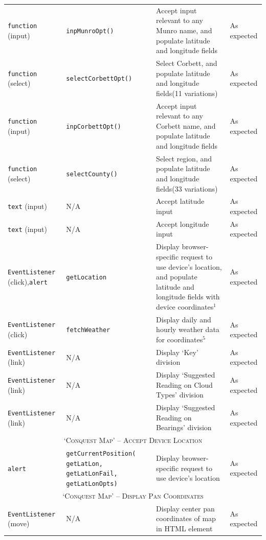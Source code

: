 \documentclass[11pt, english]{article}
\begin{document}
\begin{center}
\begin{longtable}{p{2.5cm}p{3.5cm}p{5cm}p{1.75cm}}
		\texttt{function} (input) & \texttt{inpMunroOpt()} & Accept input relevant to any Munro name, and populate latitude and longitude fields & As expected\\
		\texttt{function} (select) & \texttt{selectCorbettOpt()} & Select Corbett, and populate latitude and longitude fields\newline (11 variations) & As expected\\
		\texttt{function} (input) & \texttt{inpCorbettOpt()} & Accept input relevant to any Corbett name, and populate latitude and longitude fields & As expected\\
		\texttt{function} (select) & \texttt{selectCounty()} & Select region, and populate latitude and longitude fields\newline (33 variations) & As expected\\
		\texttt{text} (input) & N/A & Accept latitude input & As expected\\
		\texttt{text} (input) & N/A & Accept longitude input & As expected\\
		\texttt{EventListener} (click),\newline \texttt{alert} & \texttt{getLocation} & Display browser-specific request to use device's location, and populate latitude and longitude fields with device coordinates$^{1}$ & As expected\\
		\texttt{EventListener} (click) & \texttt{fetchWeather} & Display daily and hourly weather data for coordinates$^{5}$ & As expected\\
		\texttt{EventListener} (link) & N/A & Display `Key' division & As expected\\
		\texttt{EventListener} (link) & N/A & Display `Suggested Reading on Cloud Types' division & As expected\\
		\texttt{EventListener} (link) & N/A & Display `Suggested Reading on Bearings' division & As expected\\
		\hline
		\multicolumn{4}{c}{\textsc{`Conquest Map' -- Accept Device Location}}\\
		\hline
		\texttt{alert} & \texttt{getCurrentPosition( getLatLon, getLatLonFail, getLatLonOpts)} & Display browser-specific request to use device's location & As expected\\
		\hline
		\multicolumn{4}{c}{\textsc{`Conquest Map' -- Display Pan Coordinates}}\\
		\hline
		\texttt{EventListener} (move) & N/A & Display center pan coordinates of map in HTML element & As expected\\

\end{longtable}
\end{center}
\end{document}
